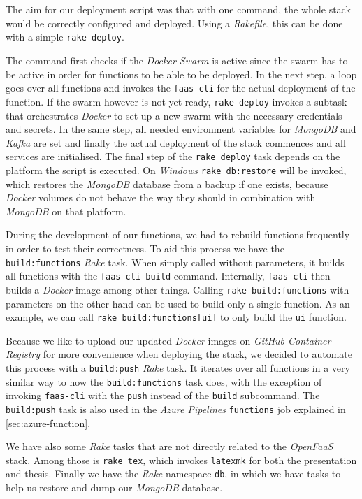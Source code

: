 \section{}

The aim for our deployment script was that with one command, the whole stack would be correctly
configured and deployed. Using a \textit{Rakefile}, this can be done with a simple
\lstinline{rake deploy}.

The command first checks if the \textit{Docker Swarm} is active since the swarm has to be active in
order for functions to be able to be deployed. In the next step, a loop goes over all functions and
invokes the \texttt{faas-cli} for the actual deployment of the function. If the swarm however is not
yet ready, \lstinline{rake deploy} invokes a subtask that orchestrates \textit{Docker} to set up a
new swarm with the necessary credentials and secrets. In the same step, all needed environment variables
for \textit{MongoDB} and \textit{Kafka} are set and finally the actual deployment of the stack
commences and all services are initialised. The final step of the \lstinline{rake deploy} task
depends on the platform the script is executed. On \textit{Windows} \lstinline{rake db:restore} will
be invoked, which restores the \textit{MongoDB} database from a backup if one exists, because
\textit{Docker} volumes do not behave the way they should in combination with \textit{MongoDB} on
that platform.

During the development of our functions, we had to rebuild functions frequently in order to test
their correctness. To aid this process we have the \texttt{build:functions} \textit{Rake}
task. When simply called without parameters, it builds all functions with the \texttt{faas-cli
build} command. Internally, \texttt{faas-cli} then builds a \textit{Docker} image among other
things. Calling \lstinline{rake build:functions} with parameters on the other hand can be used to
build only a single function. As an example, we can call \lstinline{rake build:functions[ui]} to only
build the \texttt{ui} function.

Because we like to upload our updated \textit{Docker} images on \textit{GitHub Container Registry}
for more convenience when deploying the stack, we decided to automate this process with a
\texttt{build:push} \textit{Rake} task. It iterates over all functions in a very similar way
to how the \texttt{build:functions} task does, with the exception of invoking
\texttt{faas-cli} with the \texttt{push} instead of the \texttt{build} subcommand. The
\texttt{build:push} task is also used in the \textit{Azure Pipelines} \texttt{functions} job
explained in \autoref{sec:azure-function}.

We have also some \textit{Rake} tasks that are not directly related to the \textit{OpenFaaS} stack.
Among those is \lstinline{rake tex}, which invokes \texttt{latexmk} for both the
presentation and thesis. Finally we have the \textit{Rake} namespace \texttt{db}, in which we
have tasks to help us restore and dump our \textit{MongoDB} database.
